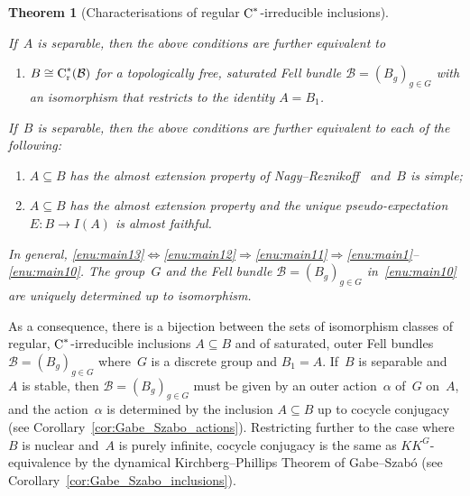 \documentclass[a4paper]{amsart}
\theoremstyle{plain}
\newtheorem{thmx}{Theorem}
\theoremstyle{definition}
\theoremstyle{remark}
\numberwithin{theorem}{section}
\numberwithin{equation}{section}
\newcommand*{\nb}{\nobreakdash}
\newcommand*{\red}{\mathrm{r}}%
\newcommand*{\Cst}{\textup C^*}%
\newcommand*{\B}{\mathcal B}%
\begin{document}
\begin{thmx}[Characterisations of regular \(\Cst\)\nb-irreducible inclusions]
\begin{enumerate}
  \end{enumerate}
  If~\(A\) is separable, then the above conditions are further
  equivalent to
  \begin{enumerate}[resume]
  \item \label{enu:main11}%
    \(B\cong \Cst_\red(\B)\) for a topologically free, saturated
    Fell bundle \(\B=(B_g)_{g\in G}\) with an isomorphism that
    restricts to the identity \(A=B_1\).
  \end{enumerate}
  If~\(B\) is separable, then the above conditions are further
  equivalent to each of the following:
  \begin{enumerate}[resume]
  \item \label{enu:main12}%
    \(A\subseteq B\) has the almost extension property of
    Nagy--Reznikoff~\cite{Nagy-Reznikoff:Pseudo-diagonals} and~\(B\)
    is simple;
  \item \label{enu:main13}%
    \(A\subseteq B\) has the almost extension property and the unique
    pseudo-expectation \(E\colon B\to I(A)\) is almost faithful.
  \end{enumerate}
  In general, \ref{enu:main13}\(\Leftrightarrow
  \)\ref{enu:main12}\(\Rightarrow \)\ref{enu:main11}\(\Rightarrow
  \)\ref{enu:main1}--\ref{enu:main10}.
  The group~\(G\) and the Fell bundle \(\B=(B_g)_{g\in G}\)
  in~\ref{enu:main10} are uniquely determined up to isomorphism.
\end{thmx}

As a consequence, there is a bijection between the sets of isomorphism
classes of regular, \(\Cst\)\nb-irreducible inclusions
\(A\subseteq B\) and of saturated, outer Fell bundles \(\B=(B_g)_{g\in
  G}\) where~\(G\) is a discrete group and \(B_1=A\).
If~\(B\) is separable and~\(A\) is stable, then \(\B=(B_g)_{g\in G}\)
must be given by an outer action~\(\alpha\) of~\(G\) on~\(A\), and the
action~\(\alpha\) is determined by the inclusion \(A\subseteq B\) up
to cocycle conjugacy (see Corollary~\ref{cor:Gabe_Szabo_actions}).
Restricting further to the case where~\(B\) is nuclear and~\(A\) is
purely infinite, cocycle conjugacy is the same as \(KK^G\)-equivalence
by the dynamical Kirchberg--Phillips Theorem of Gabe--Szab\'o
\cite{Gabe-Szabo:Dynamical_Kirchberg} (see
Corollary~\ref{cor:Gabe_Szabo_inclusions}).
\end{document}
